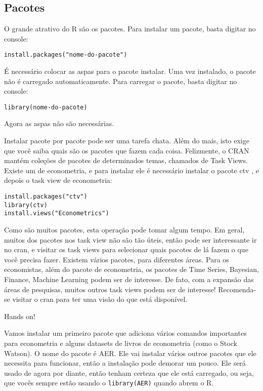 \documentclass[]{book}
\begin{document}
\subsection{Pacotes}\label{pacotes}

O grande atrativo do R são os pacotes. Para instalar um pacote, basta
digitar no console:

\begin{verbatim}
install.packages("nome-do-pacote")
\end{verbatim}

É necessário colocar as aspas para o pacote instalar. Uma vez instalado,
o pacote não é carregado automaticamente. Para carregar o pacote, basta
digitar no console:

\begin{verbatim}
library(nome-do-pacote)
\end{verbatim}

Agora as aspas não são necessárias.

Instalar pacote por pacote pode ser uma tarefa chata. Além do mais, isto
exige que você saiba quais são os pacotes que fazem cada coisa.
Felizmente, o CRAN mantém coleções de pacotes de determinados temas,
chamados de Task Views. Existe um de econometria, e para instalar ele é
necessário instalar o pacote ctv , e depois o task view de econometria:

\begin{verbatim}
install.packages("ctv")
library(ctv)
install.views("Econometrics")
\end{verbatim}

Como são muitos pacotes, esta operação pode tomar algum tempo. Em geral,
muitos dos pacotes nos task view não são tão úteis, então pode ser
interessante ir no cran, e visitar os task views para selecionar quais
pacotes de lá fazem o que você precisa fazer. Existem vários pacotes,
para diferentes áreas. Para os economistas, além do pacote de
econometria, os pacotes de Time Series, Bayesian, Finance, Machine
Learning podem ser de interesse. De fato, com a expansão das áreas de
pesquisas, muitos outros task views podem ser de interesse! Recomenda-se
visitar o cran para ter uma visão do que está disponível.

Hands on!

Vamos instalar um primeiro pacote que adiciona vários comandos
importantes para econometria e alguns datasets de livros de econometria
(como o Stock Watson). O nome do pacote é AER. Ele vai instalar vários
outros pacotes que ele necessita para funcionar, então a instalação pode
demorar um pouco. Ele será usado de agora por diante, então tenham
certeza que ele está carregado, ou seja, que vocês sempre estão usando o
\texttt{library(AER)} quando abrem o R.
\end{document}
